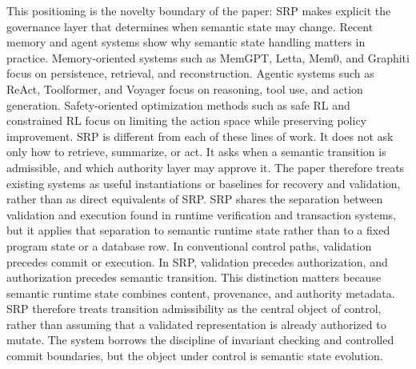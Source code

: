 {}\markdownRendererInterblockSeparator
{}This positioning is the novelty boundary of the paper: SRP makes explicit the governance layer that determines when semantic state may change.\markdownRendererInterblockSeparator
{}
\markdownRendererSectionEnd \markdownRendererSectionBegin
{}\markdownRendererInterblockSeparator
{}Recent memory and agent systems show why semantic state handling matters in practice. Memory-oriented systems such as MemGPT, Letta, Mem0, and Graphiti focus on persistence, retrieval, and reconstruction. Agentic systems such as ReAct, Toolformer, and Voyager focus on reasoning, tool use, and action generation. Safety-oriented optimization methods such as safe RL and constrained RL focus on limiting the action space while preserving policy improvement.\markdownRendererParagraphSeparator
{}SRP is different from each of these lines of work. It does not ask only how to retrieve, summarize, or act. It asks when a semantic transition is admissible, and which authority layer may approve it. The paper therefore treats existing systems as useful instantiations or baselines for recovery and validation, rather than as direct equivalents of SRP.\markdownRendererInterblockSeparator
{}
\markdownRendererSectionEnd \markdownRendererSectionBegin
{}\markdownRendererInterblockSeparator
{}SRP shares the separation between validation and execution found in runtime verification and transaction systems, but it applies that separation to semantic runtime state rather than to a fixed program state or a database row. In conventional control paths, validation precedes commit or execution. In SRP, validation precedes authorization, and authorization precedes semantic transition.\markdownRendererParagraphSeparator
{}This distinction matters because semantic runtime state combines content, provenance, and authority metadata. SRP therefore treats transition admissibility as the central object of control, rather than assuming that a validated representation is already authorized to mutate. The system borrows the discipline of invariant checking and controlled commit boundaries, but the object under control is semantic state evolution.\markdownRendererParagraphSeparator
